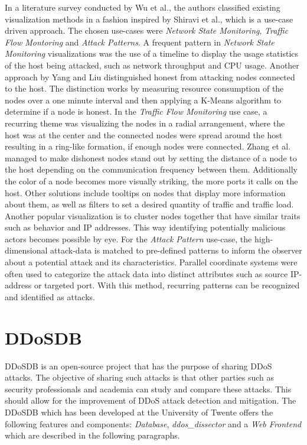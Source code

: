 In a literature survey conducted by Wu et al.\cite{wu}, the authors classified existing visualization methods in a fashion inspired by Shiravi et al.\cite{shiravi}, which is a use-case driven approach. The chosen use-cases were \textit{Network State Monitoring}, \textit{Traffic Flow Montoring} and \textit{Attack Patterns}. A frequent pattern in \textit{Network State Monitoring} visualizations was the use of a timeline to display the usage statistics of the host being attacked, such as network throughput and CPU usage\cite{chen, lee}. Another approach by Yang and Liu\cite{yang} distinguished honest from attacking nodes connected to the host. The distinction works by measuring resource consumption of the nodes over a one minute interval and then applying a K-Means algorithm to determine if a node is honest. 
In the \textit{Traffic Flow Monitoring} use case, a recurring theme was visualizing the nodes in a radial arrangement\cite{zhangRadial, pearlman, barbosa}, where the host was at the center and the connected nodes were spread around the host resulting in a ring-like formation, if enough nodes were connected. Zhang et al.\cite{zhangRadial} managed to make dishonest nodes stand out by setting the distance of a node to the host depending on the communication frequency between them. Additionally the color of a node becomes more visually striking, the more ports it calls on the host. Other solutions include tooltips on nodes that display more information about them, as well as filters to set a desired quantity of traffic and traffic load\cite{barbosa}. Another popular visualization is to cluster nodes together that have similar traits such as behavior and IP addresses\cite{zhangCluster}. This way identifying potentially malicious actors becomes possible by eye.
For the \textit{Attack Pattern} use-case, the high-dimensional attack-data is matched to pre-defined patterns to inform the observer about a potential attack and its characteristics\cite{wu}. Parallel coordinate systems were often used to categorize the attack data into distinct attributes such as source IP-address or targeted port\cite{choi, lee, okada}. With this method, recurring patterns can be recognized and identified as attacks.

\section{DDoSDB}\label{ddosdb}
DDoSDB is an open-source project that has the purpose of sharing DDoS attacks. The objective of sharing such attacks is that other parties such as security professionals and academia can study and compare these attacks. This should allow for the improvement of DDoS attack detection and mitigation\cite{ddosdb}.
The DDoSDB which has been developed at the University of Twente offers the following features and components: \emph{Database}, \emph{ddos\_dissector} and a \emph{Web Frontend} which are described in the following paragraphs.

